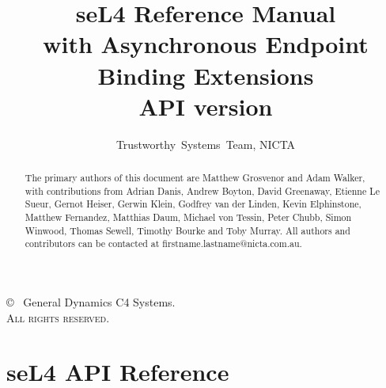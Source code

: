 \documentclass[a4paper,11pt,twoside]{report}
\date{}
\date{}
\newcommand{\version}{}
\begin{document}
  \title{seL4 Reference Manual\\with Asynchronous Endpoint Binding Extensions\\API version \version}

  \author{Trustworthy~Systems~Team, NICTA}
  \date{\commitdate}

  \maketitle

  \thispagestyle{empty}

  \vfill

  \copyright~{\commityear} General Dynamics C4 Systems.\\

  \textsc{All rights reserved}.

  \thispagestyle{empty}
  \vfill
  \renewcommand{\abstractname}{Acknowledgements}
  \begin{abstract}
The primary authors of this document are Matthew Grosvenor and Adam Walker,
with contributions from Adrian Danis, Andrew Boyton, David Greenaway, Etienne
Le Sueur, Gernot Heiser, Gerwin Klein, Godfrey van der Linden, Kevin
Elphinstone, Matthew Fernandez, Matthias Daum, Michael von Tessin, Peter Chubb,
Simon Winwood, Thomas Sewell, Timothy Bourke and Toby Murray. All authors 
and contributors can be contacted at firstname.lastname@nicta.com.au.
  \end{abstract}
  \thispagestyle{empty}

  \cleardoublepage
  \setcounter{page}{1}
  \tableofcontents
  \listoftables
  \listoffigures

  \cleardoublepage
  \setcounter{page}{1}

  

  
  
  
  
  
  
  
  

  \chapter{seL4 API Reference}
  \label{sec:api_reference}
  

  \cleardoublepage
  
  
\end{document}
